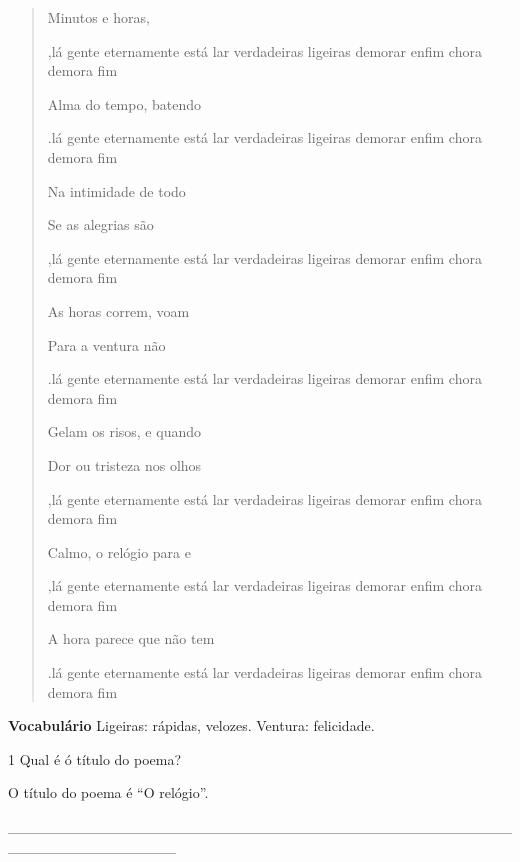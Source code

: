 \begin{boxlist}
{{\begin{quote}
Minutos e horas, 

\coment,{lá
gente
eternamente
está
lar
verdadeiras
ligeiras
demorar
enfim
chora
demora
fim}

Alma do tempo, batendo 

\coment.{lá
gente
eternamente
está
lar
verdadeiras
ligeiras
demorar
enfim
chora
demora
fim}


Na intimidade de todo 


Se as alegrias são 

\coment,{lá
gente
eternamente
está
lar
verdadeiras
ligeiras
demorar
enfim
chora
demora
fim}

As horas correm, voam 


Para a ventura não 

\coment.{lá
gente
eternamente
está
lar
verdadeiras
ligeiras
demorar
enfim
chora
demora
fim}


Gelam os risos, e quando 


Dor ou tristeza nos olhos 

\coment,{lá
gente
eternamente
está
lar
verdadeiras
ligeiras
demorar
enfim
chora
demora
fim}

Calmo, o relógio para e 

\coment,{lá
gente
eternamente
está
lar
verdadeiras
ligeiras
demorar
enfim
chora
demora
fim}

A hora parece que não tem 

\coment.{lá
gente
eternamente
está
lar
verdadeiras
ligeiras
demorar
enfim
chora
demora
fim}

\end{quote}

\textbf{Vocabulário}
Ligeiras: rápidas, velozes.
Ventura: felicidade.

\num{1} Qual é ó título do poema?

O título do poema é ``O relógio''.

\_\_\_\_\_\_\_\_\_\_\_\_\_\_\_\_\_\_\_\_\_\_\_\_\_\_\_\_\_\_\_\_\_\_\_\_\_\_\_\_\_\_\_\_\_\_\_\_\_\_\_\_\_\_\_\_\_\_\_\_\_\_\_\_

}}
\end{boxlist}
